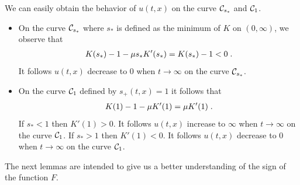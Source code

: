     \begin{remark}We can easily obtain the behavior of $u(t,x)$ on the curve $\mathcal{C}_{s_*}$ and $\mathcal{C}_1$.
    \begin{itemize}
        \item On the curve $\mathcal{C}_{s_*}$ where $s_*$ is defined as the minimum of $K$ on $(0, \infty)$, we observe that 
        \begin{align*}
            K(s_*)-1 -  \mu s_* K'(s_*) = K(s_*)-1 < 0
            \; .
        \end{align*}
        It follows $u(t, x)$ decrease to $0$ when $t \to \infty$ on the curve $\mathcal{C}_{s_*}$. 
        \item On the curve $\mathcal{C}_{1}$ defined by $s_+(t, x) = 1$ it follows that 
        \begin{align*}
            K(1)-1 -  \mu K'(1) = \mu K'(1)
            \; .
        \end{align*}
        If $s_* < 1$ then $K'(1) > 0$. 
        It follows $u(t, x)$ increase to $\infty$ when $t \to \infty$ on the curve $\mathcal{C}_{1}$.  If $s_* > 1$ then $K'(1) < 0$. 
        It follows $u(t, x)$ decrease to $0$ when $t \to \infty$ on the curve $\mathcal{C}_{1}$. 
    \end{itemize}
    \end{remark}

    The next lemmas are intended to give us a better understanding of the sign of the function $F$. 

